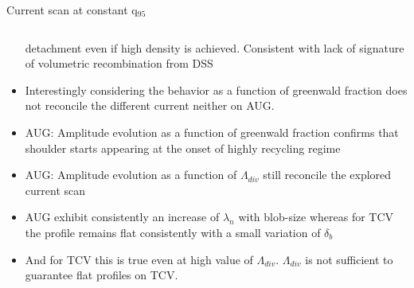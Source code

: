 \documentclass[10pt, compress]{beamer}
\begin{document}
\begin{frame}{Current scan at constant q$_{95}$}
\begin{columns}
\begin{column}{0.4\textwidth}
\begin{itemize}
          detachment even if high density is
          achieved. \alert{Consistent with lack of signature of
            volumetric recombination from DSS}
         \item<only@5> Interestingly considering the behavior as a
           function of greenwald fraction does not reconcile the
           different current neither on AUG.  
        \item<only@8> AUG: Amplitude evolution as a function of
          greenwald fraction confirms that shoulder starts appearing
          at the onset of highly recycling regime 
        \item<only@9> AUG: Amplitude evolution as a function of $\Lambda_{div}$ 
          still reconcile the explored current scan
        \item<only@10> AUG exhibit consistently an increase of
          $\lambda_n$ with blob-size whereas for TCV the profile
          remains flat consistently with a small variation of
          $\delta_b$
        \item<only@11> And for TCV this is true even at high value of
          $\Lambda_{div}$. \alert{$\Lambda_{div}$ is not sufficient to
          guarantee flat profiles on TCV.}
      \end{itemize}
    \end{column}
  \end{columns}
\end{frame}
\end{document}
